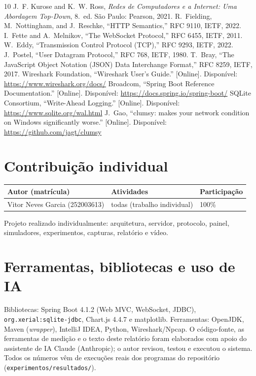 \documentclass[conference]{IEEEtran}
\begin{document}
\begin{thebibliography}{10}
 J.~F. Kurose and K.~W. Ross, \emph{Redes de Computadores e a Internet: Uma Abordagem Top-Down}, 8.~ed. São Paulo: Pearson, 2021.
 R.~Fielding, M.~Nottingham, and J.~Reschke, ``HTTP Semantics,'' RFC 9110, IETF, 2022.
 I.~Fette and A.~Melnikov, ``The WebSocket Protocol,'' RFC 6455, IETF, 2011.
 W.~Eddy, ``Transmission Control Protocol (TCP),'' RFC 9293, IETF, 2022.
 J.~Postel, ``User Datagram Protocol,'' RFC 768, IETF, 1980.
 T.~Bray, ``The JavaScript Object Notation (JSON) Data Interchange Format,'' RFC 8259, IETF, 2017.
 Wireshark Foundation, ``Wireshark User's Guide.'' [Online]. Disponível: \url{https://www.wireshark.org/docs/}
 Broadcom, ``Spring Boot Reference Documentation.'' [Online]. Disponível: \url{https://docs.spring.io/spring-boot/}
 SQLite Consortium, ``Write-Ahead Logging.'' [Online]. Disponível: \url{https://www.sqlite.org/wal.html}
 J.~Gao, ``clumsy: makes your network condition on Windows significantly worse.'' [Online]. Disponível: \url{https://github.com/jagt/clumsy}
\end{thebibliography}

\appendices
\section{Contribuição individual}
\begin{table}[h]
\centering\scriptsize\setlength{\tabcolsep}{4pt}
\begin{tabular}{@{}lll@{}}
\toprule
Autor (matrícula) & Atividades & Participação\\
\midrule
Vitor Neves Garcia (252003613) & todas (trabalho individual) & 100\%\\
\bottomrule
\end{tabular}
\end{table}
\noindent Projeto realizado individualmente: arquitetura, servidor, protocolo, painel, simuladores, experimentos, capturas, relatório e vídeo.

\section{Ferramentas, bibliotecas e uso de IA}
Bibliotecas: Spring Boot 4.1.2 (Web MVC, WebSocket, JDBC), \texttt{org.xerial:sqlite-jdbc}, Chart.js 4.4.7 e matplotlib. Ferramentas: OpenJDK, Maven (\emph{wrapper}), IntelliJ IDEA, Python, Wireshark/Npcap. O código-fonte, as ferramentas de medição e o texto deste relatório foram elaborados com apoio do assistente de IA Claude (Anthropic); o autor revisou, testou e executou o sistema. Todos os números vêm de execuções reais dos programas do repositório (\texttt{experimentos/resultados/}).
\end{document}
